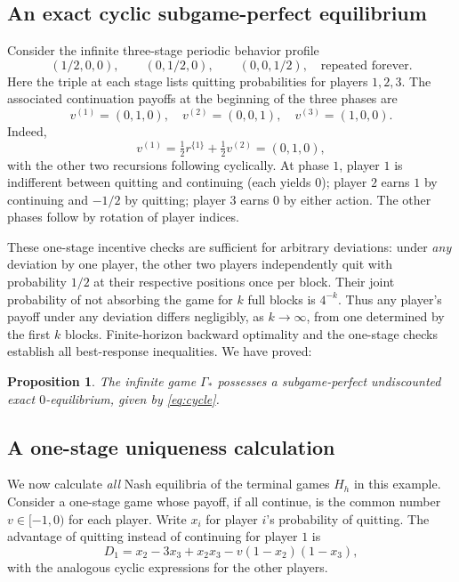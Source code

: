 \documentclass[11pt,a4paper]{article}
\numberwithin{equation}{section}
\theoremstyle{plain}
\newtheorem{proposition}[theorem]{Proposition}
\theoremstyle{definition}
\theoremstyle{remark}
\begin{document}
\subsection{An exact cyclic subgame-perfect equilibrium}
Consider the infinite three-stage periodic behavior profile
\begin{equation}\label{eq:cycle}
 (1/2,0,0),\qquad(0,1/2,0),\qquad(0,0,1/2),
 \quad\text{repeated forever.}
\end{equation}
Here the triple at each stage lists quitting probabilities for
players $1,2,3$. The associated continuation payoffs at the beginning
of the three phases are
\begin{equation}\label{eq:cyclevalues}
 v^{(1)}=(0,1,0),\quad v^{(2)}=(0,0,1),\quad v^{(3)}=(1,0,0).
\end{equation}
Indeed,
\[
 v^{(1)}=\tfrac12 r^{\{1\}}+\tfrac12 v^{(2)}=(0,1,0),
\]
with the other two recursions following cyclically. At phase $1$,
player $1$ is indifferent between quitting and continuing (each yields
$0$); player $2$ earns $1$ by continuing and $-1/2$ by quitting;
player $3$ earns $0$ by either action. The other phases follow by
rotation of player indices.

These one-stage incentive checks are sufficient for arbitrary
deviations: under \emph{any} deviation by one player, the other two
players independently quit with probability $1/2$ at their respective
positions once per block. Their joint probability of not absorbing
the game for $k$ full blocks is $4^{-k}$. Thus any player's payoff under
any deviation differs negligibly, as $k\to\infty$, from one determined
by the first $k$ blocks. Finite-horizon backward optimality and the
one-stage checks establish all best-response inequalities.
We have proved:
\begin{proposition}\label{prop:cycle}
The infinite game $\Gamma_*$ possesses a subgame-perfect
undiscounted exact $0$-equilibrium, given by \eqref{eq:cycle}.
\end{proposition}

\subsection{A one-stage uniqueness calculation}
We now calculate \emph{all} Nash equilibria of the terminal games
$H_h$ in this example. Consider a one-stage game whose payoff, if all
continue, is the common number $v\in[-1,0)$ for each player. Write
$x_i$ for player $i$'s probability of quitting. The advantage of
quitting instead of continuing for player $1$ is
\begin{equation}\label{eq:D1}
 D_1=x_2-3x_3+x_2x_3-v(1-x_2)(1-x_3),
\end{equation}
with the analogous cyclic expressions for the other players.
\end{document}
